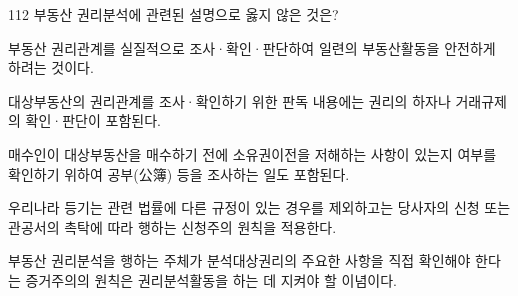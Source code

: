 \begin{question}{112}
부동산 권리분석에 관련된 설명으로 옳지 않은 것은?
\begin{choices}
  \item 부동산 권리관계를 실질적으로 조사·확인·판단하여 일련의 부동산활동을 안전하게 하려는 것이다.
  \item 대상부동산의 권리관계를 조사·확인하기 위한 판독 내용에는 권리의 하자나 거래규제의 확인·판단이 포함된다.
  \item 매수인이 대상부동산을 매수하기 전에 소유권이전을 저해하는 사항이 있는지 여부를 확인하기 위하여 공부(公簿) 등을 조사하는 일도 포함된다.
  \item 우리나라 등기는 관련 법률에 다른 규정이 있는 경우를 제외하고는 당사자의 신청 또는 관공서의 촉탁에 따라 행하는 신청주의 원칙을 적용한다.
  \item 부동산 권리분석을 행하는 주체가 분석대상권리의 주요한 사항을 직접 확인해야 한다는 증거주의의 원칙은 권리분석활동을 하는 데 지켜야 할 이념이다.
\end{choices}
\end{question}
